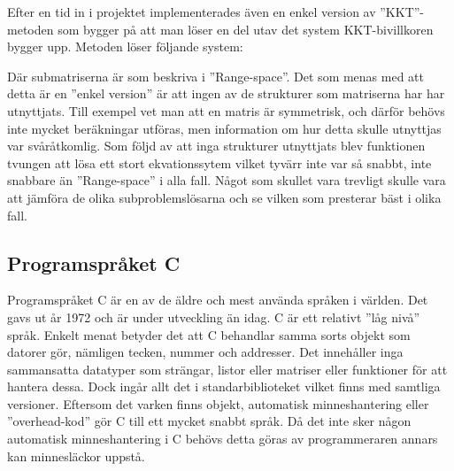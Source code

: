 Efter en tid in i projektet implementerades även en enkel version av ''KKT''-metoden som bygger på att man löser en del utav det system KKT-bivillkoren bygger upp. Metoden löser följande system:

Där submatriserna är som beskriva i ''Range-space''. Det som menas med att detta är en ''enkel version'' är att ingen av de strukturer som matriserna har har utnyttjats. Till exempel vet man att en matris är symmetrisk, och därför behövs inte mycket beräkningar utföras, men information om hur detta skulle utnyttjas var svåråtkomlig. Som följd av att inga strukturer utnyttjats blev funktionen tvungen att lösa ett stort ekvationssytem vilket tyvärr inte var så snabbt, inte snabbare än ''Range-space'' i alla fall.
\newline
\newline
Något som skullet vara trevligt skulle vara att jämföra de olika subproblemslösarna och se vilken som presterar bäst i olika fall.





\subsection{Programspråket C}
Programspråket C är en av de äldre och mest använda språken i världen. Det gavs ut år 1972 och är under utveckling än idag. C är ett relativt ''låg nivå'' språk. Enkelt menat betyder det att C behandlar samma sorts objekt som datorer gör, nämligen tecken, nummer och addresser. Det innehåller inga sammansatta datatyper som strängar, listor eller matriser eller funktioner för att hantera dessa. Dock ingår allt det i standarbiblioteket vilket finns med samtliga versioner. Eftersom det varken finns objekt, automatisk minneshantering eller ''overhead-kod'' gör C till ett mycket snabbt språk. Då det inte sker någon automatisk minneshantering i C behövs detta göras av programmeraren annars kan minnesläckor uppstå. \citep{cbible}
